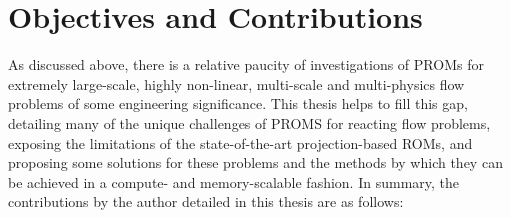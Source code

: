 \section{Objectives and Contributions}

As discussed above, there is a relative paucity of investigations of PROMs for extremely large-scale, highly non-linear, multi-scale and multi-physics flow problems of some engineering significance. This thesis helps to fill this gap, detailing many of the unique challenges of PROMS for reacting flow problems, exposing the limitations of the state-of-the-art projection-based ROMs, and proposing some solutions for these problems and the methods by which they can be achieved in a compute- and memory-scalable fashion. In summary, the contributions by the author detailed in this thesis are as follows:

